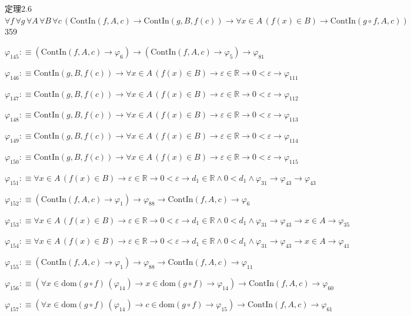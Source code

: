 \begin{fullproof}{定理2.6}{$\forall f\,\forall g\,\forall A\,\forall B\,\forall c\,(\mathrm{ContIn}(f,A,c) \to \mathrm{ContIn}(g,B,f(c)) \to \forall x \in A\,(f(x) \in B) \to \mathrm{ContIn}(g \circ f,A,c))$}{359}
\begin{abbrevlist}
\item $\varphi_{145} :\equiv (\mathrm{ContIn}(f,A,c) \to \varphi_{6}) \to (\mathrm{ContIn}(f,A,c) \to \varphi_{5}) \to \varphi_{81}$
\item $\varphi_{146} :\equiv \mathrm{ContIn}(g,B,f(c)) \to \forall x \in A\,(f(x) \in B) \to \varepsilon \in \mathbb{R} \to 0 < \varepsilon \to \varphi_{111}$
\item $\varphi_{147} :\equiv \mathrm{ContIn}(g,B,f(c)) \to \forall x \in A\,(f(x) \in B) \to \varepsilon \in \mathbb{R} \to 0 < \varepsilon \to \varphi_{112}$
\item $\varphi_{148} :\equiv \mathrm{ContIn}(g,B,f(c)) \to \forall x \in A\,(f(x) \in B) \to \varepsilon \in \mathbb{R} \to 0 < \varepsilon \to \varphi_{113}$
\item $\varphi_{149} :\equiv \mathrm{ContIn}(g,B,f(c)) \to \forall x \in A\,(f(x) \in B) \to \varepsilon \in \mathbb{R} \to 0 < \varepsilon \to \varphi_{114}$
\item $\varphi_{150} :\equiv \mathrm{ContIn}(g,B,f(c)) \to \forall x \in A\,(f(x) \in B) \to \varepsilon \in \mathbb{R} \to 0 < \varepsilon \to \varphi_{115}$
\item $\varphi_{151} :\equiv \forall x \in A\,(f(x) \in B) \to \varepsilon \in \mathbb{R} \to 0 < \varepsilon \to d_{1} \in \mathbb{R} \land 0 < d_{1} \land \varphi_{31} \to \varphi_{43} \to \varphi_{43}$
\item $\varphi_{152} :\equiv (\mathrm{ContIn}(f,A,c) \to \varphi_{1}) \to \varphi_{88} \to \mathrm{ContIn}(f,A,c) \to \varphi_{6}$
\item $\varphi_{153} :\equiv \forall x \in A\,(f(x) \in B) \to \varepsilon \in \mathbb{R} \to 0 < \varepsilon \to d_{1} \in \mathbb{R} \land 0 < d_{1} \land \varphi_{31} \to \varphi_{43} \to x \in A \to \varphi_{35}$
\item $\varphi_{154} :\equiv \forall x \in A\,(f(x) \in B) \to \varepsilon \in \mathbb{R} \to 0 < \varepsilon \to d_{1} \in \mathbb{R} \land 0 < d_{1} \land \varphi_{31} \to \varphi_{43} \to x \in A \to \varphi_{41}$
\item $\varphi_{155} :\equiv (\mathrm{ContIn}(f,A,c) \to \varphi_{1}) \to \varphi_{88} \to \mathrm{ContIn}(f,A,c) \to \varphi_{11}$
\item $\varphi_{156} :\equiv (\forall x \in \mathrm{dom}(g \circ f)\,(\varphi_{14}) \to x \in \mathrm{dom}(g \circ f) \to \varphi_{14}) \to \mathrm{ContIn}(f,A,c) \to \varphi_{60}$
\item $\varphi_{157} :\equiv (\forall x \in \mathrm{dom}(g \circ f)\,(\varphi_{14}) \to c \in \mathrm{dom}(g \circ f) \to \varphi_{15}) \to \mathrm{ContIn}(f,A,c) \to \varphi_{61}$

\end{abbrevlist}
\end{fullproof}
